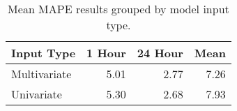 \begin{table}[H]
\centering
\begin{tabular}{lrrr}
\toprule
Input Type & 1 Hour & 24 Hour & Mean \\
\midrule
Multivariate & 5.01 & 2.77 & 7.26 \\
Univariate & 5.30 & 2.68 & 7.93 \\
\bottomrule
\end{tabular}
\caption{Mean MAPE results grouped by model input type.}
\label{input-type-MAPE}
\end{table}
